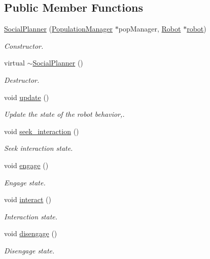 \subsection*{Public Member Functions}
\begin{DoxyCompactItemize}
\item 
\hyperlink{classSocialPlanner_ac2225f2890a3b8714d1a00d7c9a7a6c5}{Social\+Planner} (\hyperlink{classPopulationManager}{Population\+Manager} $\ast$pop\+Manager, \hyperlink{classRobot}{Robot} $\ast$\hyperlink{classSocialPlanner_a5f858fb49f0ce512d6a1d524af25d1ff}{robot})
\begin{DoxyCompactList}\small\item\em Constructor. \end{DoxyCompactList}\item 
virtual \hyperlink{classSocialPlanner_a5a6945c1e568005863a533467c2e6ae7}{$\sim$\+Social\+Planner} ()
\begin{DoxyCompactList}\small\item\em Destructor. \end{DoxyCompactList}\item 
void \hyperlink{classSocialPlanner_af5691bba77fe5d5070b2e0853fb79b5b}{update} ()
\begin{DoxyCompactList}\small\item\em Update the state of the robot behavior,. \end{DoxyCompactList}\item 
void \hyperlink{classSocialPlanner_a687dfc247b8d45945a85d0a91b576bbf}{seek\+\_\+interaction} ()
\begin{DoxyCompactList}\small\item\em Seek interaction state. \end{DoxyCompactList}\item 
void \hyperlink{classSocialPlanner_a5dc204e21fd2f4ed915e747f0132d2b4}{engage} ()
\begin{DoxyCompactList}\small\item\em Engage state. \end{DoxyCompactList}\item 
void \hyperlink{classSocialPlanner_a933dd6fd8dbc7f0734b041ab9523d49e}{interact} ()
\begin{DoxyCompactList}\small\item\em Interaction state. \end{DoxyCompactList}\item 
void \hyperlink{classSocialPlanner_abe00dd899b52d575bbd37663e6154967}{disengage} ()
\begin{DoxyCompactList}\small\item\em Disengage state. \end{DoxyCompactList}\item 

\end{DoxyCompactItemize}
